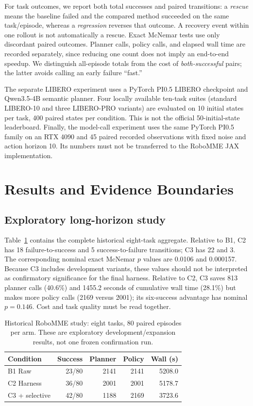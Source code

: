 \documentclass[letterpaper,10pt,conference]{ieeeconf}
\begin{document}
For task outcomes, we report both total successes and paired transitions: a \emph{rescue} means the baseline failed and the compared method succeeded on the same task/episode, whereas a \emph{regression} reverses that outcome. A recovery event within one rollout is not automatically a rescue. Exact McNemar tests use only discordant paired outcomes. Planner calls, policy calls, and elapsed wall time are recorded separately, since reducing one count does not imply an end-to-end speedup. We distinguish all-episode totals from the cost of \emph{both-successful} pairs; the latter avoids calling an early failure ``fast.''

The separate LIBERO experiment uses a PyTorch PI0.5 LIBERO checkpoint and Qwen3.5-4B semantic planner. Four locally available ten-task suites (standard LIBERO-10 and three LIBERO-PRO variants) are evaluated on 10 initial states per task, 400 paired states per condition. This is not the official 50-initial-state leaderboard. Finally, the model-call experiment uses the same PyTorch PI0.5 family on an RTX 4090 and 45 paired recorded observations with fixed noise and action horizon 10. Its numbers must not be transferred to the RoboMME JAX implementation.

\section{Results and Evidence Boundaries}
\label{sec:results}
\subsection{Exploratory long-horizon study}
Table~\ref{tab:robomme} contains the complete historical eight-task aggregate. Relative to B1, C2 has 18 failure-to-success and 5 success-to-failure transitions; C3 has 22 and 3. The corresponding nominal exact McNemar $p$ values are 0.0106 and 0.000157. Because C3 includes development variants, these values should not be interpreted as confirmatory significance for the final harness. Relative to C2, C3 saves 813 planner calls (40.6\%) and 1455.2 seconds of cumulative wall time (28.1\%) but makes more policy calls (2169 versus 2001); its six-success advantage has nominal $p=0.146$. Cost and task quality must be read together.

\begin{table}[t]
\caption{Historical RoboMME study: eight tasks, 80 paired episodes per arm. These are exploratory development/expansion results, not one frozen confirmation run.}
\label{tab:robomme}
\centering\footnotesize
\begin{tabular}{lrrrr}
\toprule
Condition & Success & Planner & Policy & Wall (s)\\
\midrule
B1 Raw & 23/80 & 2141 & 2141 & 5208.0\\
C2 Harness & 36/80 & 2001 & 2001 & 5178.7\\
C3 + selective & 42/80 & 1188 & 2169 & 3723.6\\
\bottomrule
\end{tabular}
\end{table}
\end{document}
